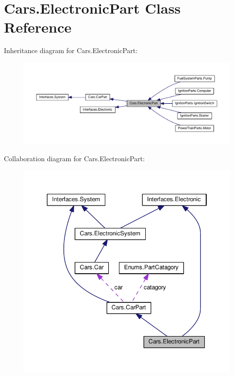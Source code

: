 \hypertarget{classCars_1_1ElectronicPart}{}\section{Cars.\+Electronic\+Part Class Reference}
\label{classCars_1_1ElectronicPart}


Inheritance diagram for Cars.\+Electronic\+Part\+:\nopagebreak
\begin{figure}[H]
\begin{center}
\leavevmode
\includegraphics[width=350pt]{classCars_1_1ElectronicPart__inherit__graph}
\end{center}
\end{figure}


Collaboration diagram for Cars.\+Electronic\+Part\+:\nopagebreak
\begin{figure}[H]
\begin{center}
\leavevmode
\includegraphics[width=346pt]{classCars_1_1ElectronicPart__coll__graph}
\end{center}
\end{figure}
